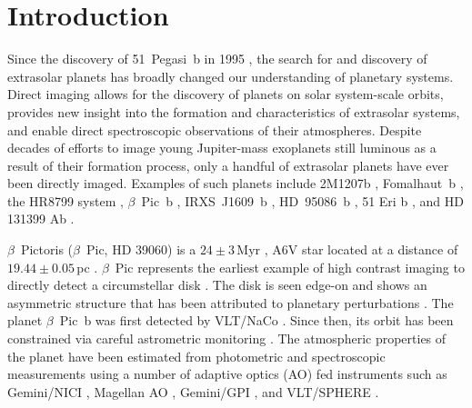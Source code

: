\documentclass[twocolumn]{aastex6}
\begin{document}





\section{Introduction}

Since the discovery of 51~Pegasi~b in 1995 \citep{MayorQueloz1995}, the search for and discovery of extrasolar planets has broadly changed our understanding of planetary systems. Direct imaging allows for the discovery of planets on solar system-scale orbits, provides new insight into the formation and characteristics of extrasolar systems, and enable direct spectroscopic observations of their atmospheres. Despite decades of efforts to image young Jupiter-mass exoplanets still luminous as a result of their formation process, only a handful of extrasolar planets have ever been directly imaged. Examples of such planets include 2M1207b \citep{Chauvin2005}, \mbox{Fomalhaut b} \citep{Kalas2008}, the HR8799 system \citep{Marois2008,Marois2010}, $\beta$~Pic~b \citep{Lagrange2010}, \mbox{IRXS J1609 b} \citep{Lafreniere2010}, \mbox{HD 95086 b} \citep{Rameau2013}, 51 Eri b \citep{Macintosh2015}, and HD 131399 Ab \citep{2016Sci...353..673W}.

$\beta$~Pictoris ($\beta$~Pic, HD 39060) is a $24\pm3$\,Myr \citep{Bell2015}, A6V star located at a distance of $19.44\pm0.05$\,pc \citep{Gray2006, vanLeeuwen2007}. $\beta$~Pic represents the earliest example of high contrast imaging to directly detect a circumstellar disk \citep{SmithTerrile1984}. The disk is seen edge-on and shows an asymmetric structure that has been attributed to planetary perturbations  \citep{Burrows1995,Kalas1995,Golimowski2006,Mouillet1997,Heap2000,Augereau2001}. The planet $\beta$~Pic~b was first detected by VLT/NaCo \citep{Lagrange2010}. Since then, its orbit has been constrained via careful astrometric monitoring \citep{chauvin2012,Nielsen2014,MillarBlanchaer2015,wang2016}. The atmospheric properties of the planet have been estimated from photometric and spectroscopic measurements using a number of adaptive optics (AO) fed instruments such as Gemini/NICI \citep{Boccaletti2013}, Magellan AO \citep{Males2014,Morzinski2015}, Gemini/GPI \citep{Chilcote2015}, and VLT/SPHERE \citep{Baudino2015}. 
\end{document}
